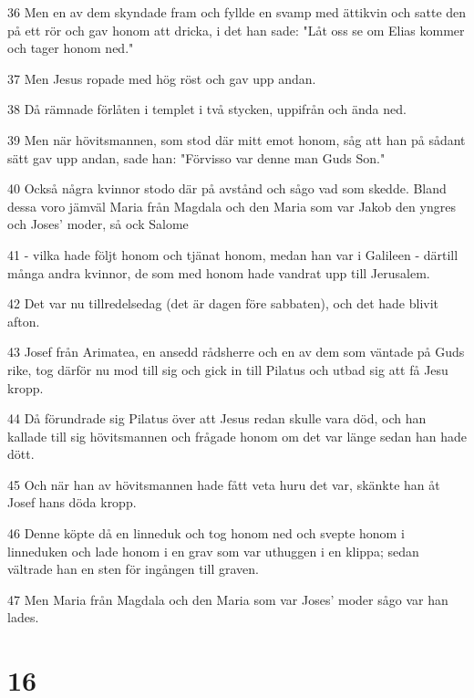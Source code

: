 \par 36 Men en av dem skyndade fram och fyllde en svamp med ättikvin och satte den på ett rör och gav honom att dricka, i det han sade: "Låt oss se om Elias kommer och tager honom ned."
\par 37 Men Jesus ropade med hög röst och gav upp andan.
\par 38 Då rämnade förlåten i templet i två stycken, uppifrån och ända ned.
\par 39 Men när hövitsmannen, som stod där mitt emot honom, såg att han på sådant sätt gav upp andan, sade han: "Förvisso var denne man Guds Son."
\par 40 Också några kvinnor stodo där på avstånd och sågo vad som skedde. Bland dessa voro jämväl Maria från Magdala och den Maria som var Jakob den yngres och Joses' moder, så ock Salome
\par 41 - vilka hade följt honom och tjänat honom, medan han var i Galileen - därtill många andra kvinnor, de som med honom hade vandrat upp till Jerusalem.
\par 42 Det var nu tillredelsedag (det är dagen före sabbaten), och det hade blivit afton.
\par 43 Josef från Arimatea, en ansedd rådsherre och en av dem som väntade på Guds rike, tog därför nu mod till sig och gick in till Pilatus och utbad sig att få Jesu kropp.
\par 44 Då förundrade sig Pilatus över att Jesus redan skulle vara död, och han kallade till sig hövitsmannen och frågade honom om det var länge sedan han hade dött.
\par 45 Och när han av hövitsmannen hade fått veta huru det var, skänkte han åt Josef hans döda kropp.
\par 46 Denne köpte då en linneduk och tog honom ned och svepte honom i linneduken och lade honom i en grav som var uthuggen i en klippa; sedan vältrade han en sten för ingången till graven.
\par 47 Men Maria från Magdala och den Maria som var Joses' moder sågo var han lades.

\chapter{16}

